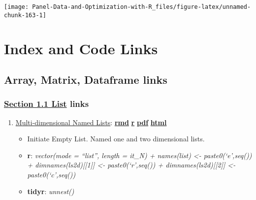 \documentclass[
]{book}
\providecommand{\tightlist}{%
  \setlength{\itemsep}{0pt}\setlength{\parskip}{0pt}}
\begin{document}
\begin{center}\texttt{[image: Panel-Data-and-Optimization-with-R\_files/figure-latex/unnamed-chunk-163-1]} \end{center}

\hypertarget{appendix-appendix}{%
\appendix}


\hypertarget{index-and-code-links}{%
\chapter{Index and Code Links}\label{index-and-code-links}}

\hypertarget{array-matrix-dataframe-links}{%
\section{Array, Matrix, Dataframe links}\label{array-matrix-dataframe-links}}

\hypertarget{section-1.1-listlist-links}{%
\subsection{\texorpdfstring{\protect\hyperlink{list}{Section 1.1 List} links}{Section 1.1 List links}}\label{section-1.1-listlist-links}}

\begin{enumerate}
\def\labelenumi{\arabic{enumi}.}
\tightlist
\item
  \href{https://fanwangecon.github.io/R4Econ/amto/list/htmlpdfr/fs_lst_basics.html}{Multi-dimensional Named Lists}: \href{https://github.com/FanWangEcon/R4Econ/blob/master/amto/list//fs_lst_basics.Rmd}{\textbf{rmd}} \textbar{} \href{https://github.com/FanWangEcon/R4Econ/blob/master/amto/list/htmlpdfr/fs_lst_basics.R}{\textbf{r}} \textbar{} \href{https://github.com/FanWangEcon/R4Econ/blob/master/amto/list/htmlpdfr/fs_lst_basics.pdf}{\textbf{pdf}} \textbar{} \href{https://fanwangecon.github.io/R4Econ/amto/list/htmlpdfr/fs_lst_basics.html}{\textbf{html}}

  \begin{itemize}
  \tightlist
  \item
    Initiate Empty List. Named one and two dimensional lists.
  \item
    \textbf{r}: \emph{vector(mode = ``list'', length = it\_N) + names(list) \textless- paste0(`e',seq()) + dimnames(ls2d){[}{[}1{]}{]} \textless- paste0(`r',seq()) + dimnames(ls2d){[}{[}2{]}{]} \textless- paste0(`c',seq())}
  \item
    \textbf{tidyr}: \emph{unnest()}
  \end{itemize}
\end{enumerate}
\end{document}
